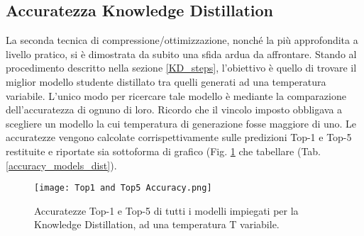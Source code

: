 \subsection{Accuratezza Knowledge Distillation}
La seconda tecnica di compressione/ottimizzazione, nonché la più approfondita a livello pratico, si è dimostrata da subito una sfida ardua da affrontare. Stando al procedimento descritto nella sezione \ref{KD_steps}, l'obiettivo è quello di trovare il miglior modello studente distillato tra quelli generati ad una temperatura variabile. L'unico modo per ricercare tale modello è mediante la comparazione dell'accuratezza di ognuno di loro. Ricordo che il vincolo imposto obbligava a scegliere un modello la cui temperatura di generazione fosse maggiore di uno. Le accuratezze vengono calcolate corrispettivamente sulle predizioni Top-1 e Top-5 restituite e riportate sia sottoforma di grafico (Fig. \ref{accuracy_KD} che tabellare (Tab. \ref{accuracy_models_dist}).
\begin{figure}
    \centering
    \texttt{[image: Top1 and Top5 Accuracy.png]}
    \centering
    \caption{Accuratezze Top-1 e Top-5 di tutti i modelli impiegati per la Knowledge Distillation, ad una temperatura T variabile.}
    \label{accuracy_KD}
\end{figure}
